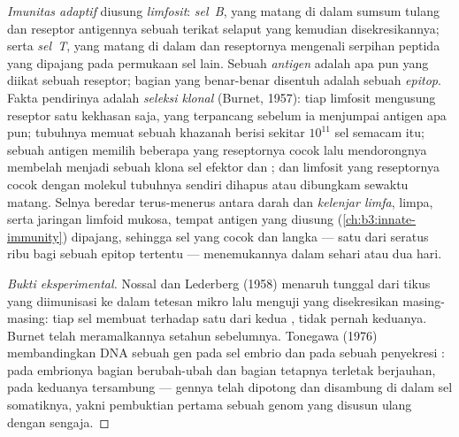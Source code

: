 \begin{definition}\label{def:b3:adaptive-immunity:lymphocytes}
%
\emph{Imunitas adaptif} diusung \emph{limfosit}: \emph{sel~B},
yang matang di dalam sumsum tulang dan reseptor antigennya sebuah
\emph{} terikat selaput yang kemudian disekresikannya; serta \emph{sel~T},
yang matang di dalam  dan reseptornya mengenali
serpihan peptida yang dipajang pada permukaan sel lain. Sebuah
\emph{antigen} adalah apa pun yang diikat sebuah reseptor; bagian yang
benar-benar disentuh adalah sebuah \emph{epitop}. Fakta pendirinya adalah
\emph{seleksi klonal} (Burnet, 1957): tiap limfosit mengusung reseptor satu
kekhasan saja, yang terpancang sebelum ia menjumpai antigen apa pun; tubuhnya
memuat sebuah khazanah berisi sekitar $10^{11}$ sel semacam itu; sebuah antigen
memilih beberapa yang reseptornya cocok lalu mendorongnya membelah menjadi
sebuah klona sel efektor dan ; dan limfosit yang reseptornya cocok
dengan molekul tubuhnya sendiri dihapus atau dibungkam sewaktu matang. Selnya
beredar terus-menerus antara darah dan \emph{kelenjar limfa},
limpa, serta jaringan limfoid mukosa, tempat antigen yang diusung 
(\cref{ch:b3:innate-immunity}) dipajang, sehingga sel yang cocok dan
langka --- satu dari seratus ribu bagi sebuah epitop tertentu ---
menemukannya dalam sehari atau dua hari.
\end{definition}

\begin{proof}[Bukti eksperimental]
Nossal dan Lederberg (1958) menaruh  tunggal dari tikus yang
diimunisasi ke dalam tetesan mikro lalu menguji  yang disekresikan
masing-masing: tiap sel membuat  terhadap satu dari kedua ,
tidak pernah keduanya. Burnet telah meramalkannya setahun sebelumnya. Tonegawa
(1976) membandingkan DNA sebuah gen  pada sel embrio dan pada sebuah
 penyekresi : pada embrionya bagian berubah-ubah dan bagian
tetapnya terletak berjauhan, pada  keduanya tersambung --- gennya telah
dipotong dan disambung di dalam sel somatiknya, yakni pembuktian pertama sebuah
genom yang disusun ulang dengan sengaja.
\end{proof}

